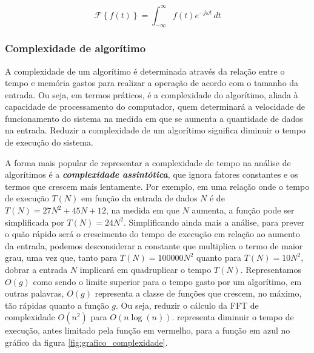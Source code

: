 \begin{equation} \label{eq:DTFT}
	\mathcal{F} 	\left \{ f(t) \right \}  = \int_{-\infty}^{\infty} f(t) e^{-j \omega t}\,dt
\end{equation}

\subsubsection{Complexidade de algorítimo}

A complexidade de um algorítimo é determinada através da relação entre o tempo e memória gastos para realizar a operação de acordo com o tamanho da entrada. Ou seja, em termos práticos, é a complexidade do algorítimo, aliada à capacidade de processamento do computador, quem determinará a velocidade de funcionamento do sistema na medida em que se aumenta a quantidade de dados na entrada. Reduzir a complexidade de um algorítimo significa diminuir o tempo de execução do sistema.

A forma mais popular de representar a complexidade de tempo na análise de algorítimos é a \textbf{\textit{complexidade assintótica}}, que ignora fatores constantes e os termos que crescem mais lentamente. Por exemplo, em uma relação onde o tempo de execução $T(N)$ em função da entrada de dados $N$ é de $T(N) = 27N^2 + 45N + 12$, na medida em que $N$ aumenta, a função pode ser simplificada por $T(N) = 24N^2$. Simplificando ainda mais a análise, para prever o quão rápido será o crescimento do tempo de execução em relação ao aumento da entrada, podemos desconsiderar a constante que multiplica o termo de maior grau, uma vez que, tanto para $T(N) = 100000N^2$ quanto para $T(N) = 10N^2$, dobrar a entrada $N$ implicará em quadruplicar o tempo $T(N)$. Representamos $O(g)$ como sendo o limite superior para o tempo gasto por um algorítimo, em outras palavras, $O(g)$ representa a classe de funções que crescem, no máximo, tão rápidas quanto a função $g$. Ou seja, reduzir o cálculo da FFT de complexidade \boldmath $O(n^2)$ para $O(n \log (n)) $.   \unboldmath representa diminuir o tempo de execução, antes limitado pela função em vermelho, para a função em azul no gráfico da figura \ref{fig:grafico_complexidade}.

